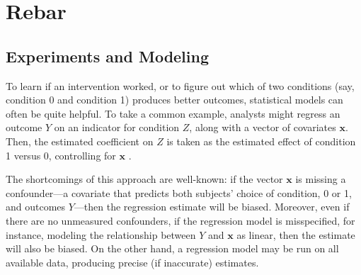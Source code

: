 \documentclass{edm_template}
\begin{document}
\section{Rebar}
\subsection{Experiments and Modeling}
To learn if an intervention worked, or to figure out which of two conditions (say, condition 0 and condition 1) produces better outcomes, statistical models can often be quite helpful. 
To take a common example, analysts might regress an outcome $Y$ on an indicator for condition $Z$, along with a vector of covariates $\bm{x}$.
Then, the estimated coefficient on $Z$ is taken as the estimated effect of condition 1 versus 0, controlling for $\bm{x}$ \cite{yule1899investigation}. 

The shortcomings of this approach are well-known: if the vector $\bm{x}$ is missing a confounder---a covariate that predicts both subjects' choice of condition, 0 or 1, and outcomes $Y$---then the regression estimate will be biased. 
Moreover, even if there are no unmeasured confounders, if the regression model is misspecified, for instance, modeling the relationship between $Y$ and $\bm{x}$ as linear, then the estimate will also be biased. 
On the other hand, a regression model may be run on all available data, producing precise (if inaccurate) estimates. 
\end{document}
